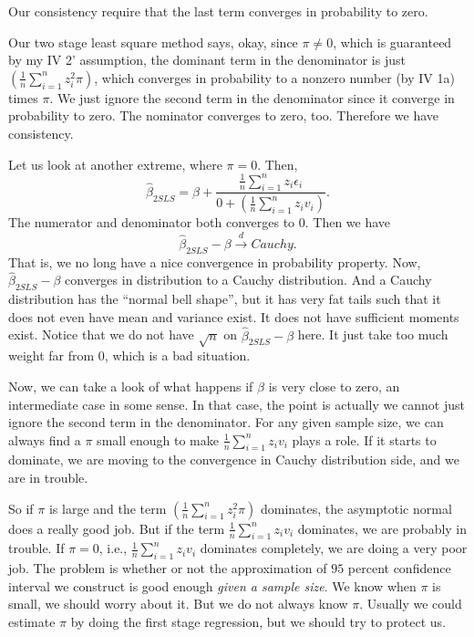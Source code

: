 \documentclass[11pt,a4paper]{amsart}
\theoremstyle{plain}
\theoremstyle{definition}
\begin{document}
		Our consistency require that the last term converges in probability to zero. \par 
		Our two stage least square method says, okay, since $\pi \ne 0$, which is guaranteed by my IV 2' assumption, the dominant term in the denominator is just $(\frac{1}{n}\sum_{i=1}^{n}z_{i}^{2}\pi)$, which converges in probability to a nonzero number (by IV 1a) times $\pi$. We just ignore the second term in the denominator since it converge in probability to zero. The nominator converges to zero, too. Therefore we have consistency.\par 
		Let us look at another extreme, where $\pi = 0$. Then, 
		\[		\hat{\beta}_{2SLS} = \beta + \frac{\frac{1}{n}\sum_{i=1}^{n}z_{i}\epsilon_{i}}{0 + (\frac{1}{n}\sum_{i=1}^{n}z_{i}v_{i})}.	\]
		The numerator and denominator both converges to $0$. Then we have 
		\[	\hat{\beta}_{2SLS} - \beta \stackrel{d}{\longrightarrow} Cauchy.	\]
		That is, we no long have a nice convergence in probability property. Now, $\hat{\beta}_{2SLS} - \beta $ converges in distribution to a Cauchy distribution. And a Cauchy distribution has the ``normal bell shape'', but it has very fat tails such that it does not even have mean and variance exist. It does not have sufficient moments exist. Notice that we do not have $\sqrt{n}$ on $\hat{\beta}_{2SLS} - \beta $  here. It just take too much weight far from $0$, which is a bad situation.\par 
		Now, we can take a look of what happens if $\beta$ is very close to zero, an intermediate case in some sense. In that case, the point is actually we cannot just ignore the second term in the denominator. For any given sample size, we can always find a $\pi$ small enough to make $\frac{1}{n}\sum_{i=1}^{n}z_{i}v_{i}$ plays a role. If it starts to dominate, we are moving to the convergence in Cauchy distribution side, and we are in trouble. \par 
		So if $\pi$ is large and the term $(\frac{1}{n}\sum_{i=1}^{n}z_{i}^{2}\pi)$ dominates, the asymptotic normal does a really good job. But if the term  $\frac{1}{n}\sum_{i=1}^{n}z_{i}v_{i}$ dominates, we are probably in trouble. If $\pi = 0$, i.e., $\frac{1}{n}\sum_{i=1}^{n}z_{i}v_{i}$ dominates completely, we are doing a very poor job.  The problem is whether or not the approximation of $95$ percent confidence interval we construct is good enough \emph{given a sample size}. We know when $\pi$ is small, we should worry about it. But we do not always know $\pi$. Usually we could estimate $\pi$ by doing the first stage regression, but we should try to protect us.\par 
\end{document}
